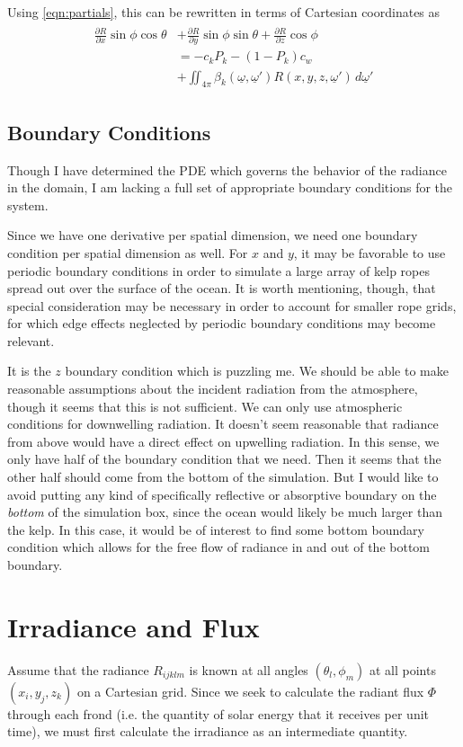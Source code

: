 \documentclass[10pt]{article}
\begin{document}
\begin{multicols}{2}
Using \eqref{eqn:partials}, this can be rewritten in terms of Cartesian coordinates as
\begin{align}
	\begin{split}
	\frac{\partial R}{\partial x}\sin\phi \cos\theta 
	&+ \frac{\partial R}{\partial y}\sin\phi \sin\theta
	+ \frac{\partial R}{\partial z}\cos\phi \\ 
	&= - c_kP_k - (1-P_k)c_w \\
	&+ \iint_{4\pi}
	\beta_k(\underline{\omega},\underline{\omega}')
	R(x,y,z,\underline{\omega}')\,d\underline{\omega}'
	\end{split}
	\label{eqn:rte2}
\end{align}
\subsection{Boundary Conditions}
Though I have determined the PDE which governs the behavior of the radiance in the domain, I am lacking a full set of appropriate boundary conditions for the system.

Since we have one derivative per spatial dimension, we need one boundary condition per spatial dimension as well.
For $x$ and $y$, it may be favorable to use periodic boundary conditions in order to simulate a large array of kelp ropes spread out over the surface of the ocean.
It is worth mentioning, though, that special consideration may be necessary in order to account for smaller rope grids, for which edge effects neglected by periodic boundary conditions may become relevant.

It is the $z$ boundary condition which is puzzling me.
We should be able to make reasonable assumptions about the incident radiation from the atmosphere, though it seems that this is not sufficient.
We can only use atmospheric conditions for downwelling radiation.
It doesn't seem reasonable that radiance from above would have a direct effect on upwelling radiation.
In this sense, we only have half of the boundary condition that we need.
Then it seems that the other half should come from the bottom of the simulation.
But I would like to avoid putting any kind of specifically reflective or absorptive boundary on the \textit{bottom} of the simulation box, since the ocean would likely be much larger than the kelp.
In this case, it would be of interest to find some bottom boundary condition which allows for the free flow of radiance in and out of the bottom boundary.

\section{Irradiance and Flux}
Assume that the radiance $R_{ijklm}$ is known at all angles $(\theta_l,\phi_m)$ at all points $(x_i,y_j,z_k)$ on a Cartesian grid.
Since we seek to calculate the radiant flux $\Phi$ through each frond (i.e. the quantity of solar energy that it receives per unit time), we must first calculate the irradiance as an intermediate quantity.


\end{multicols}
\end{document}
